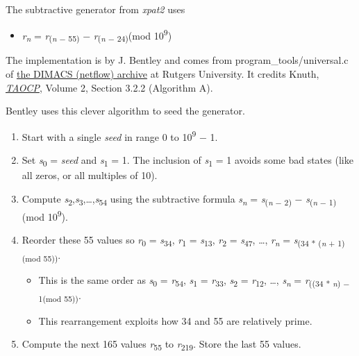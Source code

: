 The subtractive generator from \emph{xpat2} uses

\begin{itemize}
\item
  \emph{r}\textsubscript{\emph{n}} = \emph{r}\textsubscript{(\emph{n} −
  55)} − \emph{r}\textsubscript{(\emph{n} − 24)}(mod
  10\textsuperscript{9})
\end{itemize}

The implementation is by J. Bentley and comes from
program\_tools/universal.c of
\href{ftp://dimacs.rutgers.edu/pub/netflow/}{the DIMACS (netflow)
archive} at Rutgers University. It credits Knuth,
\href{http://en.wikipedia.org/wiki/The\_Art\_of\_Computer\_Programming}{\emph{TAOCP}},
Volume 2, Section 3.2.2 (Algorithm A).

\pagebreak{}
Bentley uses this clever algorithm to seed the generator.

\begin{enumerate}
\item
  Start with a single \emph{s}\emph{e}\emph{e}\emph{d} in range 0 to
  10\textsuperscript{9} − 1.
\item
  Set \emph{s}\textsubscript{0} = \emph{s}\emph{e}\emph{e}\emph{d} and
  \emph{s}\textsubscript{1} = 1. The inclusion of
  \emph{s}\textsubscript{1} = 1 avoids some bad states (like all zeros,
  or all multiples of 10).
\item
  Compute
  \emph{s}\textsubscript{2},\emph{s}\textsubscript{3},\ldots{},\emph{s}\textsubscript{54}
  using the subtractive formula \emph{s}\textsubscript{\emph{n}} =
  \emph{s}\textsubscript{(\emph{n} − 2)} −
  \emph{s}\textsubscript{(\emph{n} − 1)}(mod 10\textsuperscript{9}).
\item
  Reorder these 55 values so \emph{r}\textsubscript{0} =
  \emph{s}\textsubscript{34}, \emph{r}\textsubscript{1} =
  \emph{s}\textsubscript{13}, \emph{r}\textsubscript{2} =
  \emph{s}\textsubscript{47}, \ldots{}, \emph{r}\textsubscript{\emph{n}}
  = \emph{s}\textsubscript{(34 * (\emph{n} + 1)(mod 55))}.

  \begin{itemize}
  \item
    This is the same order as \emph{s}\textsubscript{0} =
    \emph{r}\textsubscript{54}, \emph{s}\textsubscript{1} =
    \emph{r}\textsubscript{33}, \emph{s}\textsubscript{2} =
    \emph{r}\textsubscript{12}, \ldots{},
    \emph{s}\textsubscript{\emph{n}} = \emph{r}\textsubscript{((34 *
    \emph{n}) − 1(mod 55))}.
  \item
    This rearrangement exploits how 34 and 55 are relatively prime.
  \end{itemize}
\item
  Compute the next 165 values \emph{r}\textsubscript{55} to
  \emph{r}\textsubscript{219}. Store the last 55 values.
\end{enumerate}

